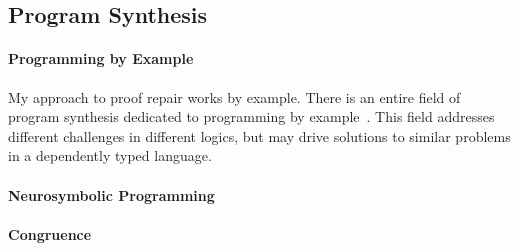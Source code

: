 \subsection{Program Synthesis}
\label{sec:synthesis}

\paragraph{Programming by Example}
My approach to proof repair works by example.
There is an entire field of program synthesis dedicated to programming by example~\cite{DBLP:journals/ftpl/GulwaniPS17}. 
This field addresses different challenges in different logics,
but may drive solutions to similar problems in a dependently typed language.

\paragraph{Neurosymbolic Programming}

\paragraph{Congruence}

\fi


